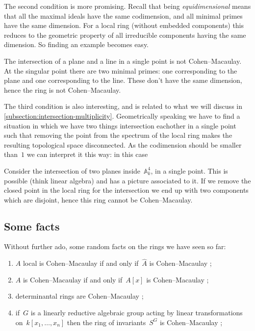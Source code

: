 \documentclass[10pt,a4paper]{article}
\begin{document}
The second condition is more promising. Recall that being \emph{equidimensional} means that all the maximal ideals have the same codimension, and all minimal primes have the same dimension. For a local ring (without embedded components) this reduces to the geometric property of all irreducible components having the same dimension. So finding an example becomes easy.
\begin{example}
  The intersection of a plane and a line in a single point is not Cohen--Macaulay. At the singular point there are two minimal primes: one corresponding to the plane and one corresponding to the line. These don't have the same dimension, hence the ring is not Cohen--Macaulay.
\end{example}

The third condition is also interesting, and is related to what we will discuss in \cref{subsection:intersection-multiplicity}. Geometrically speaking we have to find a situation in which we have two things intersection eachother in a single point such that removing the point from the spectrum of the local ring makes the resulting topological space disconnected. As the codimension should be smaller than~$1$ we can interpret it this way: in this case 
\begin{example}
  Consider the intersection of two planes inside~$\mathbb{A}_k^4$, in a single point. This is possible (think linear algebra) and has a picture associated to it. If we remove the closed point in the local ring for the intersection we end up with two components which are disjoint, hence this ring cannot be Cohen--Macaulay.
\end{example}

\subsection{Some facts}
Without further ado, some random facts on the rings we have seen so far:
\begin{enumerate}
  \item $A$ local is Cohen--Macaulay if and only if~$\hat{A}$ is Cohen--Macaulay \cite[proposition 18.8]{eisenbud-commutative-algebra};
  \item $A$ is Cohen--Macaulay if and only if~$A[x]$ is Cohen--Macaulay \cite[proposition 18.9]{eisenbud-commutative-algebra};
  \item determinantal rings are Cohen--Macaulay \cite[theorem 18.18]{eisenbud-commutative-algebra};
  \item if~$G$ is a linearly reductive algebraic group acting by linear transformations on~$k[x_1,\dotsc,x_n]$ then the ring of invariants~$S^G$ is Cohen--Macaulay \cite[\S 18.5]{eisenbud-commutative-algebra};
\end{enumerate}
\end{document}
